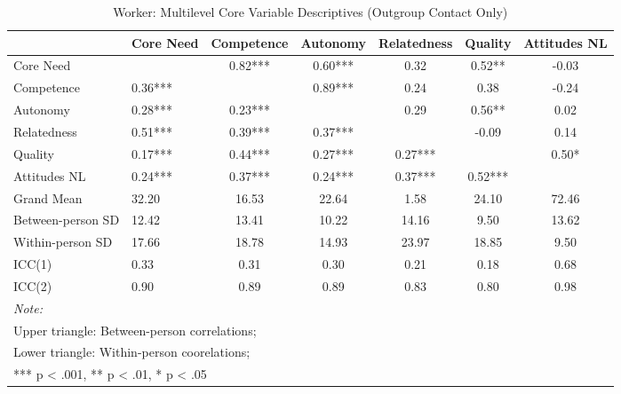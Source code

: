 \begin{table}
\begin{minipage}[t][\textheight][t]{\textwidth}

\caption{\label{tab:workerOutVarDescr}Worker: Multilevel Core Variable Descriptives (Outgroup Contact Only)}
\centering
\begin{tabular}[t]{llccccc}
\toprule
  & Core Need & Competence & Autonomy & Relatedness & Quality & Attitudes NL\\
\midrule
Core Need &  & 0.82*** & 0.60*** & 0.32 & 0.52** & -0.03\\
Competence & 0.36*** &  & 0.89*** & 0.24 & 0.38 & -0.24\\
Autonomy & 0.28*** & 0.23*** &  & 0.29 & 0.56** & 0.02\\
Relatedness & 0.51*** & 0.39*** & 0.37*** &  & -0.09 & 0.14\\
Quality & 0.17*** & 0.44*** & 0.27*** & 0.27*** &  & 0.50*\\
Attitudes NL & 0.24*** & 0.37*** & 0.24*** & 0.37*** & 0.52*** & \\
\addlinespace
Grand Mean & 32.20 & 16.53 & 22.64 & 1.58 & 24.10 & 72.46\\
Between-person SD & 12.42 & 13.41 & 10.22 & 14.16 & 9.50 & 13.62\\
Within-person SD & 17.66 & 18.78 & 14.93 & 23.97 & 18.85 & 9.50\\
ICC(1) & 0.33 & 0.31 & 0.30 & 0.21 & 0.18 & 0.68\\
ICC(2) & 0.90 & 0.89 & 0.89 & 0.83 & 0.80 & 0.98\\
\bottomrule
\multicolumn{7}{l}{\rule{0pt}{1em}\textit{Note: }}\\
\multicolumn{7}{l}{\rule{0pt}{1em}Upper triangle: Between-person correlations;}\\
\multicolumn{7}{l}{\rule{0pt}{1em}Lower triangle: Within-person coorelations;}\\
\multicolumn{7}{l}{\rule{0pt}{1em}*** p < .001, ** p < .01,  * p < .05}\\
\end{tabular}
\end{minipage}
\end{table}

